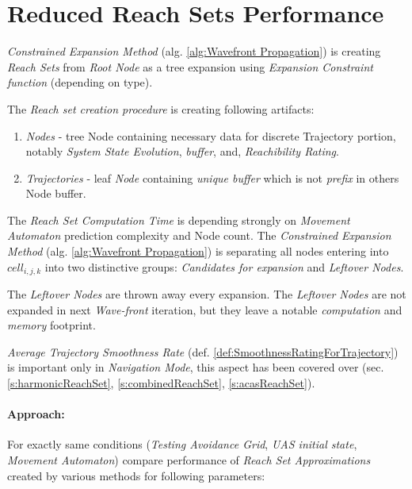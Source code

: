 \section{Reduced Reach Sets Performance}\label{sec:reducedReachSetPerformance}

\noindent \emph{Constrained Expansion Method} (alg. \ref{alg:Wavefront Propagation}) is creating \emph{Reach Sets} from \emph{Root Node} as a tree expansion using \emph{Expansion Constraint function} (depending on type).

The \emph{Reach set creation procedure} is creating following artifacts:
\begin{enumerate}
    \item \emph{Nodes} - tree Node containing necessary data for discrete Trajectory portion, notably \emph{System State Evolution}, \emph{buffer}, and, \emph{Reachibility Rating}.
    
    \item \emph{Trajectories} - leaf \emph{Node} containing \emph{unique buffer} which is not \emph{prefix} in others Node buffer. 
\end{enumerate}

The \emph{Reach Set Computation Time} is depending strongly on \emph{Movement Automaton} prediction complexity and Node count. The \emph{Constrained Expansion Method} (alg. \ref{alg:Wavefront Propagation}) is separating all nodes entering into $cell_{i,j,k}$ into two distinctive groups: \emph{Candidates for expansion} and \emph{Leftover Nodes}. 

The \emph{Leftover Nodes} are thrown away every expansion. The \emph{Leftover Nodes} are not expanded in next \emph{Wave-front} iteration, but they leave a notable \emph{computation} and \emph{memory} footprint.

\begin{note}
    \emph{Average Trajectory Smoothness Rate} (def. \ref{def:SmoothnessRatingForTrajectory}) is important only in \emph{Navigation Mode}, this aspect has been covered over (sec. \ref{s:harmonicReachSet}, \ref{s:combinedReachSet}, \ref{s:acasReachSet}).
\end{note}

\paragraph{Approach:} For exactly same conditions (\emph{Testing Avoidance Grid}, \emph{UAS initial state}, \emph{Movement Automaton}) compare performance of \emph{Reach Set Approximations} created by various methods for following parameters:

